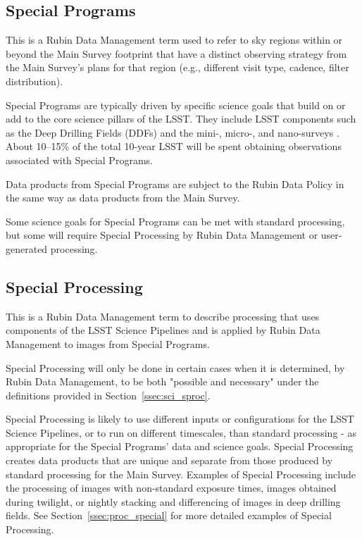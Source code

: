 \subsection{Special Programs} 

This is a Rubin Data Management term used to refer to sky regions within
or beyond the Main Survey footprint that have a distinct observing strategy from
the Main Survey's plans for that region (e.g., different visit type, cadence, filter distribution).

Special Programs are typically driven by specific science goals that build on or 
add to the core science pillars of the LSST.
They include LSST components such as the Deep Drilling 
Fields (DDFs) and the mini-, micro-, and nano-surveys .
About 10--15\% of the total 10-year LSST will be spent obtaining 
observations associated with Special Programs.

Data products from Special Programs are subject to the Rubin Data Policy 
in the same way as data products from the Main Survey.

Some science goals for Special Programs can be met with standard processing,
but some will require Special Processing by Rubin Data Management or user-generated processing.

\subsection{Special Processing}

This is a Rubin Data Management term to describe processing that 
uses components of the LSST Science Pipelines and is applied by Rubin
Data Management to images from Special Programs.

Special Processing will only be done in certain cases when it
is determined, by Rubin Data Management, to be both "possible and necessary"
under the definitions provided in Section~\ref{ssec:sci_sproc}.

Special Processing is likely to use different inputs or configurations for the
LSST Science Pipelines, or to run on different timescales, than standard processing - 
as appropriate for the Special Programs' data and science goals.
Special Processing creates data products that are unique and separate from those produced
by standard processing for the Main Survey.
Examples of Special Processing include the processing
of images with non-standard exposure times, images obtained
during twilight, or nightly stacking and differencing
of images in deep drilling fields.
See Section~\ref{ssec:proc_special} for more detailed examples of Special Processing.

